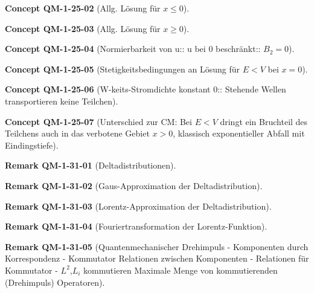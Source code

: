 \documentclass[10pt, letterpaper]{article}
\newcommand{\CustomHeading}[3]{%
  \par\medskip\noindent%
  \textbf{#1 #2} \textnormal{(#3)}.\enskip%
}
\newenvironment{REM}[2]{\CustomHeading{Remark}{#1}{#2}}{}
\newenvironment{CONC}[2]{\CustomHeading{Concept}{#1}{#2}}{}
\begin{document}
\begin{CONC}{QM-1-25-02}{Allg. Lösung für $x\leq 0$}
\end{CONC}

\begin{CONC}{QM-1-25-03}{Allg. Lösung für $x\geq 0$}
\end{CONC}

\begin{CONC}{QM-1-25-04}{Normierbarkeit von u:: u bei $0$ beschränkt:: $B_2=0$}
\end{CONC}

\begin{CONC}{QM-1-25-05}{Stetigkeitsbedingungen an Lösung für $E<V$ bei $x=0$}
\end{CONC}

\begin{CONC}{QM-1-25-06}{W-keits-Stromdichte konstant 0:: Stehende Wellen transportieren keine Teilchen}
\end{CONC}

\begin{CONC}{QM-1-25-07}{Unterschied zur CM: Bei $E<V$ dringt ein Bruchteil des Teilchens auch in das verbotene Gebiet $x>0$, klassisch exponentieller Abfall mit Eindingstiefe}
\end{CONC}

\begin{REM}{QM-1-31-01}{Deltadistributionen}
\end{REM}

\begin{REM}{QM-1-31-02}{Gaus-Approximation der Deltadistribution}
\end{REM}

\begin{REM}{QM-1-31-03}{Lorentz-Approximation der Deltadistribution}
\end{REM}

\begin{REM}{QM-1-31-04}{Fouriertransformation der Lorentz-Funktion}
\end{REM}

\begin{REM}{QM-1-31-05}{Quantenmechanischer Drehimpuls
- Komponenten durch Korrespondenz
- Kommutator Relationen zwischen Komponenten
- Relationen für Kommutator
- $L^2$,$L_i$ kommutieren
Maximale Menge von kommutierenden (Drehimpuls) Operatoren}
\end{REM}
\end{document}
